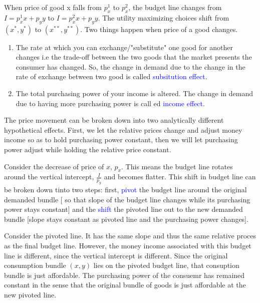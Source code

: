 \documentclass{tufte-handout}
\begin{document}
When price of good x falls from $p^1_x$ to $p^2_x$, the budget line changes from  $ I = p_x^1x + p_yy$ to  $ I = p_x^2x + p_yy$. The utility maximizing choices shift from  $(x^*,y^*)$ to $(x^{**},y^{**})$. Two things happen when price of a good changes.

\begin{enumerate}
		\item The rate at which you can exchange/"substitute"  one good for another changes i.e the trade-off between the two goods that the market presents the consumer has changed. So, the change in demand due to the change in the rate of exchange between two good is called \textcolor{blue}{subsitution effect}.

		\item The total purchasing power of your income is altered. The change in demand due to having more purchasing power is call
ed \textcolor{blue}{ income effect.}

\end{enumerate}




The price  movement can be broken down into two analytically different hypothetical effects. First, we let the relative prices change and adjust money income so as to hold purchasing power constant, then we will let purchasing power adjust while holding the relative price constant.


\clearpage


Consider the decrease of price of $x$,  $p_x$. This means the budget line rotates around the vertical intercept,  $\frac{I}{p_y}$ and becomes flatter. This  shift in budget line can be broken down tinto two steps: first,\textcolor{blue}{ pivot} the budget line around the original demanded bundle [ so that slope of the budget line changes while its purchasing power stays constant] and the \textcolor{blue}{shift} the pivoted line out to the new demanded bundle [slope stays constant as pivoted line and the purchasing power changes].


Consider the pivoted line. It has the same slope and thus the same relative proces as the final budget line. However, the money income associated with this budget line is different, since the vertical intercept is different. Since the original consumption bundle $(x,y)$ lies on the pivoted budget line, that consuption bundle is just affordable. The purchasing power of the consuemr has remained constant in the sense that the original bundle of goods is just affordable at the new pivoted line.
\end{document}
